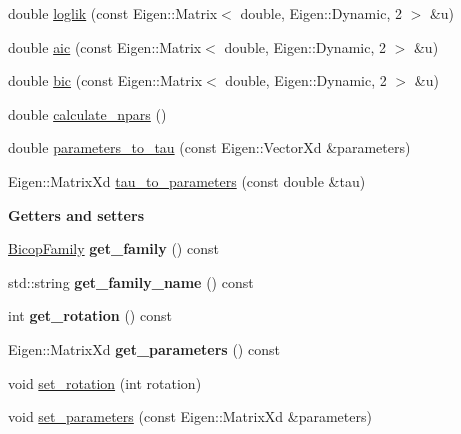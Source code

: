 \begin{DoxyCompactItemize}
\item 
double \hyperlink{classvinecopulib_1_1_bicop_ae8bcc0c3265cc86565333a0cfd3d619d}{loglik} (const Eigen\+::\+Matrix$<$ double, Eigen\+::\+Dynamic, 2 $>$ \&u)
\item 
double \hyperlink{classvinecopulib_1_1_bicop_a9287fec95519fea64a2ae80f5888c709}{aic} (const Eigen\+::\+Matrix$<$ double, Eigen\+::\+Dynamic, 2 $>$ \&u)
\item 
double \hyperlink{classvinecopulib_1_1_bicop_ac1f480d13b3464260c2dd6aa88b2e130}{bic} (const Eigen\+::\+Matrix$<$ double, Eigen\+::\+Dynamic, 2 $>$ \&u)
\item 
double \hyperlink{classvinecopulib_1_1_bicop_a9f3b3b83c54a9e1d809fdee058f3eb11}{calculate\+\_\+npars} ()
\item 
double \hyperlink{classvinecopulib_1_1_bicop_aa25436353dee76e4368fb941a7efa257}{parameters\+\_\+to\+\_\+tau} (const Eigen\+::\+Vector\+Xd \&parameters)
\item 
Eigen\+::\+Matrix\+Xd \hyperlink{classvinecopulib_1_1_bicop_a5809ddc9884f6fb66fe53289be348913}{tau\+\_\+to\+\_\+parameters} (const double \&tau)
\end{DoxyCompactItemize}
\begin{Indent}{\bf Getters and setters}\par
\begin{DoxyCompactItemize}
\item 
\hyperlink{namespacevinecopulib_a42e95cc06d33896199caab0c11ad44f3}{Bicop\+Family} {\bfseries get\+\_\+family} () const \hypertarget{classvinecopulib_1_1_bicop_a68ab3556ee3bb3d02814fd978573bf3b}{}\label{classvinecopulib_1_1_bicop_a68ab3556ee3bb3d02814fd978573bf3b}

\item 
std\+::string {\bfseries get\+\_\+family\+\_\+name} () const \hypertarget{classvinecopulib_1_1_bicop_a4d4fbc0fdca17564c23f4814d5d2fbe7}{}\label{classvinecopulib_1_1_bicop_a4d4fbc0fdca17564c23f4814d5d2fbe7}

\item 
int {\bfseries get\+\_\+rotation} () const \hypertarget{classvinecopulib_1_1_bicop_ab8e52577a50fbfc57277f9240d8eac03}{}\label{classvinecopulib_1_1_bicop_ab8e52577a50fbfc57277f9240d8eac03}

\item 
Eigen\+::\+Matrix\+Xd {\bfseries get\+\_\+parameters} () const \hypertarget{classvinecopulib_1_1_bicop_a93ab0dd89826e50b209ea3760f251f2f}{}\label{classvinecopulib_1_1_bicop_a93ab0dd89826e50b209ea3760f251f2f}

\item 
void \hyperlink{classvinecopulib_1_1_bicop_a4e359624560a089273b25dc74879bd16}{set\+\_\+rotation} (int rotation)
\item 
void \hyperlink{classvinecopulib_1_1_bicop_ac8d1d4266b0fd7e2f971d0149f881ef9}{set\+\_\+parameters} (const Eigen\+::\+Matrix\+Xd \&parameters)
\end{DoxyCompactItemize}
\end{Indent}
